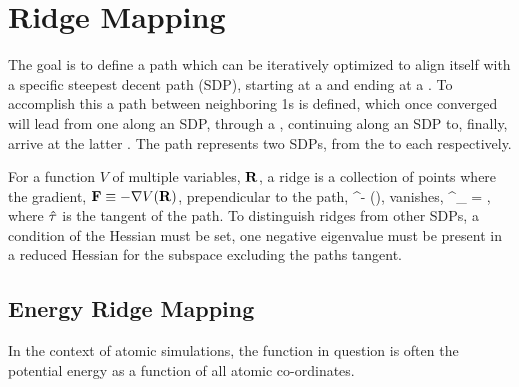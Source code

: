 \section{Ridge Mapping}
The goal is to define a path which can be iteratively optimized to align itself with a specific steepest decent path (SDP),
starting at a  and ending at a .
To accomplish this a path between neighboring \sap1s is defined,
which once converged will lead from one  along an SDP,
through a ,
continuing along an SDP to, finally, arrive at the latter .
The path represents two SDPs, from the  to each  respectively.

For a function $V$ of multiple variables, $\mathbf{R}$, a ridge is a collection of points where the gradient, $\mathbf{F} \equiv -\nabla V(\mathbf{R})$, prependicular to the path,
\beq
\vF^\perp \equiv \vF - (\vF \cdot \uvt)\uvt,
\eeq
vanishes,
\beq
\vF^\perp_ = ,
\eeq
where $\hat{\mathbf{\tau}}$ is the tangent of the path.
To distinguish ridges from other SDPs, a condition of the Hessian must be set, one negative eigenvalue must be present in a reduced Hessian for the subspace excluding the paths tangent.


\incomplete

\subsection{Energy Ridge Mapping}
In the context of atomic simulations, the function in question is often the potential energy as a function of all atomic co-ordinates.

\incomplete

